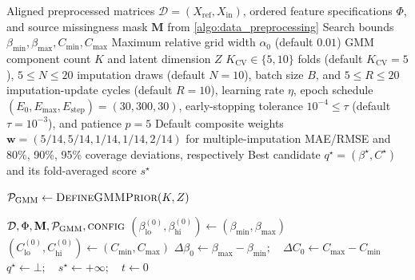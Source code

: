\begin{algorithm}[ht]
\footnotesize
{}
\label{algo:betaC_Grid_halving}
\begin{algorithmic}[1]
\setlength{\itemsep}{0.3em}

\Require Aligned preprocessed matrices
         $\mathcal D=(X_{\mathrm{ref}},X_{\mathrm{in}})$,
         ordered feature specifications $\Phi$,
         and source missingness mask $\mathbf M$ from
         \cref{algo:data_preprocessing}
\Require Search bounds $\beta_{\min},\beta_{\max},C_{\min},C_{\max}$
\Require Maximum relative grid width $\alpha_0$ (default $0.01$)
\Require GMM component count $K$ and latent dimension $Z$
\Require $K_{\mathrm{CV}}\in\{5,10\}$ folds (default $K_{\mathrm{CV}}=5$),
         $5\leq N\leq20$ imputation draws
         (default $N=10$), batch size $B$, and $5\leq R\leq20$
         imputation-update cycles (default $R=10$), learning rate $\eta$,
         epoch schedule $(E_0,E_{\max},E_{\mathrm{step}})=(30,300,30)$,
         early-stopping tolerance $10^{-4}\leq\tau$ (default $\tau=10^{-3}$),
         and patience $p=5$
\Require Default composite weights $\mathbf w=(5/14,5/14,1/14,1/14,2/14)$
         for multiple-imputation MAE/RMSE and 80\%, 90\%, 95\% coverage
         deviations, respectively
\Ensure Best candidate $q^\star=(\beta^\star,C^\star)$ and its
         fold-averaged score $s^\star$

\State $\mathcal P_{\mathrm{GMM}}\gets
       \textsc{DefineGMMPrior}(K,Z)$

\Statex
{}
          {$\mathcal D,\Phi,\mathbf M,\mathcal P_{\mathrm{GMM}},\textsc{config}$}
  \State $(\beta_{\mathrm{lo}}^{(0)},\beta_{\mathrm{hi}}^{(0)})
         \gets(\beta_{\min},\beta_{\max})$
  \State $(C_{\mathrm{lo}}^{(0)},C_{\mathrm{hi}}^{(0)})
         \gets(C_{\min},C_{\max})$
  \State $\Delta\beta_0\gets\beta_{\max}-\beta_{\min};\quad
         \Delta C_0\gets C_{\max}-C_{\min}$
  \State $q^\star\gets\bot;\quad s^\star\gets+\infty;\quad t\gets0$


\end{algorithmic}
\end{algorithm}

